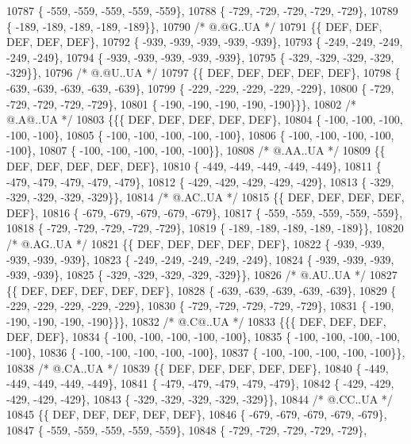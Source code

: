 \begin{DoxyCode}
10787 \{ -559, -559, -559, -559, -559\},
10788 \{ -729, -729, -729, -729, -729\},
10789 \{ -189, -189, -189, -189, -189\}\},
10790 \textcolor{comment}{/*  @.@G..UA */}
10791 \{\{  DEF,  DEF,  DEF,  DEF,  DEF\},
10792 \{ -939, -939, -939, -939, -939\},
10793 \{ -249, -249, -249, -249, -249\},
10794 \{ -939, -939, -939, -939, -939\},
10795 \{ -329, -329, -329, -329, -329\}\},
10796 \textcolor{comment}{/*  @.@U..UA */}
10797 \{\{  DEF,  DEF,  DEF,  DEF,  DEF\},
10798 \{ -639, -639, -639, -639, -639\},
10799 \{ -229, -229, -229, -229, -229\},
10800 \{ -729, -729, -729, -729, -729\},
10801 \{ -190, -190, -190, -190, -190\}\}\},
10802 \textcolor{comment}{/*  @.A@..UA */}
10803 \{\{\{  DEF,  DEF,  DEF,  DEF,  DEF\},
10804 \{ -100, -100, -100, -100, -100\},
10805 \{ -100, -100, -100, -100, -100\},
10806 \{ -100, -100, -100, -100, -100\},
10807 \{ -100, -100, -100, -100, -100\}\},
10808 \textcolor{comment}{/*  @.AA..UA */}
10809 \{\{  DEF,  DEF,  DEF,  DEF,  DEF\},
10810 \{ -449, -449, -449, -449, -449\},
10811 \{ -479, -479, -479, -479, -479\},
10812 \{ -429, -429, -429, -429, -429\},
10813 \{ -329, -329, -329, -329, -329\}\},
10814 \textcolor{comment}{/*  @.AC..UA */}
10815 \{\{  DEF,  DEF,  DEF,  DEF,  DEF\},
10816 \{ -679, -679, -679, -679, -679\},
10817 \{ -559, -559, -559, -559, -559\},
10818 \{ -729, -729, -729, -729, -729\},
10819 \{ -189, -189, -189, -189, -189\}\},
10820 \textcolor{comment}{/*  @.AG..UA */}
10821 \{\{  DEF,  DEF,  DEF,  DEF,  DEF\},
10822 \{ -939, -939, -939, -939, -939\},
10823 \{ -249, -249, -249, -249, -249\},
10824 \{ -939, -939, -939, -939, -939\},
10825 \{ -329, -329, -329, -329, -329\}\},
10826 \textcolor{comment}{/*  @.AU..UA */}
10827 \{\{  DEF,  DEF,  DEF,  DEF,  DEF\},
10828 \{ -639, -639, -639, -639, -639\},
10829 \{ -229, -229, -229, -229, -229\},
10830 \{ -729, -729, -729, -729, -729\},
10831 \{ -190, -190, -190, -190, -190\}\}\},
10832 \textcolor{comment}{/*  @.C@..UA */}
10833 \{\{\{  DEF,  DEF,  DEF,  DEF,  DEF\},
10834 \{ -100, -100, -100, -100, -100\},
10835 \{ -100, -100, -100, -100, -100\},
10836 \{ -100, -100, -100, -100, -100\},
10837 \{ -100, -100, -100, -100, -100\}\},
10838 \textcolor{comment}{/*  @.CA..UA */}
10839 \{\{  DEF,  DEF,  DEF,  DEF,  DEF\},
10840 \{ -449, -449, -449, -449, -449\},
10841 \{ -479, -479, -479, -479, -479\},
10842 \{ -429, -429, -429, -429, -429\},
10843 \{ -329, -329, -329, -329, -329\}\},
10844 \textcolor{comment}{/*  @.CC..UA */}
10845 \{\{  DEF,  DEF,  DEF,  DEF,  DEF\},
10846 \{ -679, -679, -679, -679, -679\},
10847 \{ -559, -559, -559, -559, -559\},
10848 \{ -729, -729, -729, -729, -729\},

\end{DoxyCode}
